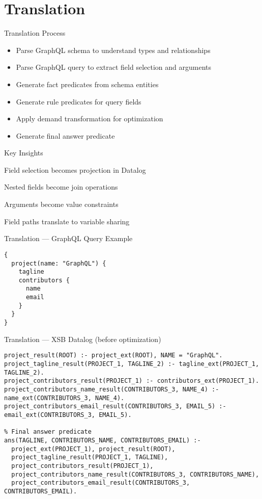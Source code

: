 \documentclass{beamer}
\begin{document}
\section{Translation}
\begin{frame}[fragile]{Translation Process}
  \begin{itemize}
    \item Parse GraphQL schema to understand types and relationships
    \item Parse GraphQL query to extract field selection and arguments
    \item Generate fact predicates from schema entities
    \item Generate rule predicates for query fields
    \item Apply demand transformation for optimization
    \item Generate final answer predicate
  \end{itemize}
  
  \begin{block}{Key Insights}
    \item Field selection becomes projection in Datalog
    \item Nested fields become join operations
    \item Arguments become value constraints
    \item Field paths translate to variable sharing
  \end{block}
\end{frame}

\begin{frame}[fragile]{Translation — GraphQL Query Example}
\begin{lstlisting}
{
  project(name: "GraphQL") {
    tagline
    contributors {
      name
      email
    }
  }
}
\end{lstlisting}
\end{frame}

\begin{frame}[fragile]{Translation — XSB Datalog (before optimization)}
\begin{lstlisting}[basicstyle=\scriptsize\ttfamily]
% Rules for field: project
project_result(ROOT) :- project_ext(ROOT), NAME = "GraphQL".
project_tagline_result(PROJECT_1, TAGLINE_2) :- tagline_ext(PROJECT_1, TAGLINE_2).
project_contributors_result(PROJECT_1) :- contributors_ext(PROJECT_1).
project_contributors_name_result(CONTRIBUTORS_3, NAME_4) :- name_ext(CONTRIBUTORS_3, NAME_4).
project_contributors_email_result(CONTRIBUTORS_3, EMAIL_5) :- email_ext(CONTRIBUTORS_3, EMAIL_5).

% Final answer predicate 
ans(TAGLINE, CONTRIBUTORS_NAME, CONTRIBUTORS_EMAIL) :- 
  project_ext(PROJECT_1), project_result(ROOT),
  project_tagline_result(PROJECT_1, TAGLINE), 
  project_contributors_result(PROJECT_1),
  project_contributors_name_result(CONTRIBUTORS_3, CONTRIBUTORS_NAME),
  project_contributors_email_result(CONTRIBUTORS_3, CONTRIBUTORS_EMAIL).
\end{lstlisting}
\end{frame}
\end{document}
